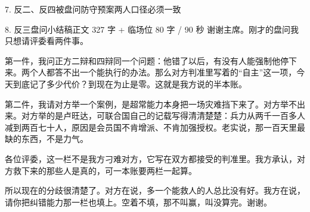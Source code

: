 \documentclass[script,con]{debate}
\begin{document}
\begin{stage}{7. 反二、反四被盘问防守预案}{两人口径必须一致}
\begin{qaa}
\end{qaa}
\end{stage}
\begin{speech}{8. 反三盘问小结稿}{正文 327 字 + 临场位 80 字 / 90 秒}
谢谢主席。刚才的盘问我只想请评委看两件事。

第一件，我问正方二辩和四辩同一个问题：他错了以后，有没有人能强制他停下来。两个人都答不出一个能执行的办法。那么对方判准里写着的“自主”这一项，今天到底记了多少代价？到现在为止是零。这就是我方说的半本账。

第二件，我请对方举一个案例，是超常能力本身把一场灾难挡下来了。对方举不出来。对方举的是卢旺达，可联合国自己的记载写得清清楚楚：兵力从两千一百多人减到两百七十人，原因是会员国不肯增派、不肯加强授权。老实说，那一百天里最缺的东西，不是力气。

各位评委，这一栏不是我方刁难对方，它写在双方都接受的判准里。我方承认，对方救下来的那些人是真的，可一本账要两栏一起算。

所以现在的分歧很清楚了。对方在说，多一个能救人的人总比没有好。我方在说，请你把纠错能力那一栏也填上。空着不填，那不叫赢，叫没算完。谢谢。

\begin{contingency}
\end{contingency}
\end{speech}
\end{document}
